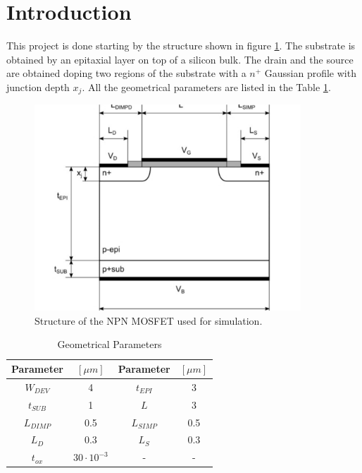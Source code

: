 \documentclass[11pt,a4paper]{article}
\begin{document}
	\section{Introduction}
		This project is done starting by the structure shown in figure \ref*{fig:struttura}. The substrate is obtained by an epitaxial layer on top of a silicon bulk. The drain and the source are obtained doping two regions of the substrate with a $n^+$ Gaussian profile with junction depth \(x_j\). All the geometrical parameters are listed in the Table \ref*{geom}.
		\begin{figure}
			\centering
			\includegraphics[width=100mm]{struttura}
			\caption{Structure of the NPN MOSFET used for simulation.}
			\label{fig:struttura}
		\end{figure}	
		\begin{table}[h]
			\caption{Geometrical Parameters}
			\centering
			\begin{tabular}[H]{|| c | c | c | c ||}
				\hline
				Parameter & $[\mu m]$ & Parameter & $[\mu m]$ \\ [0.5ex] 
				\hline\hline
				$W_{DEV}$ & 4 & $t_{EPI}$& 3 \\
				\hline
				$t_{SUB}$ & 1 & $L$        & 3 \\
				\hline
				$L_{DIMP}$ & 0.5 & $L_{SIMP}$ & 0.5\\
				\hline
				$L_{D}$ & 0.3 & $L_{S}$& 0.3\\
				\hline
				$t_{ox}$ & $30 \cdot 10^{-3} $ &- &-\\
				\hline
			\end{tabular}
			\label{geom}
		\end{table}
\end{document}
